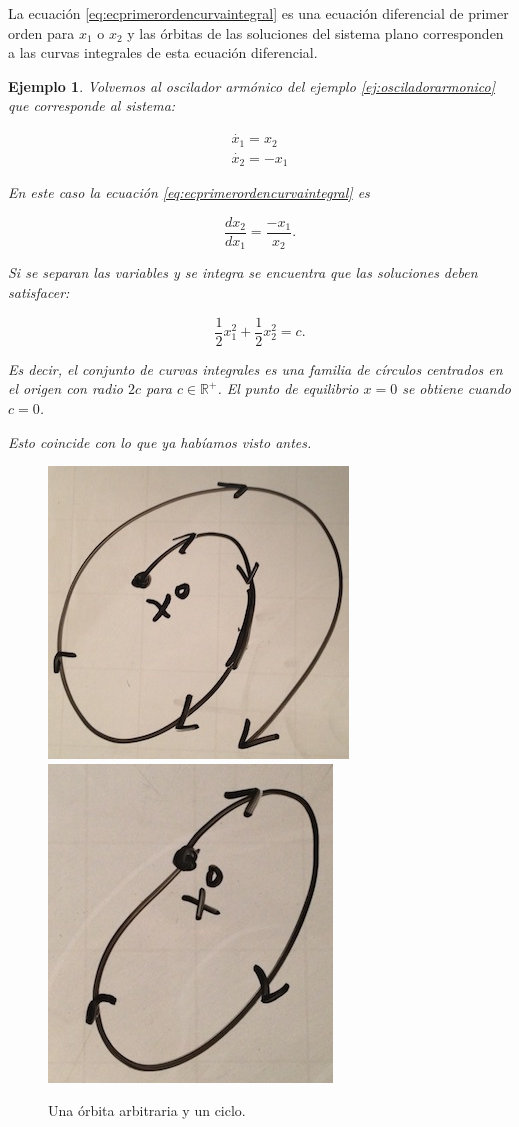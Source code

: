 \documentclass[11pt]{book}
\theoremstyle{definition}
\numberwithin{definition}{section}
\theoremstyle{theorem}
\numberwithin{theorem}{section}
\numberwithin{lemma}{section}
\numberwithin{corollary}{section}
\theoremstyle{plain}
\newtheorem{example}{Ejemplo}
\numberwithin{example}{section}
\newcommand{\R}{{\ensuremath{\mathbb{R}}}}
\begin{document}
La ecuación \ref{eq:ecprimerordencurvaintegral} es una ecuación diferencial de primer orden para $x_1$ o $x_2$ y las órbitas de las soluciones del sistema plano corresponden a las curvas integrales de esta ecuación diferencial.

\begin{example}
Volvemos al oscilador armónico del ejemplo \ref{ej:osciladorarmonico} que corresponde al sistema:

$$
\begin{array}{l}
	\dot{x_1} = x_2 \\
	\dot{x_2} = -x_1
\end{array}
$$

En este caso la ecuación \ref{eq:ecprimerordencurvaintegral} es

$$ \dfrac{dx_2}{dx_1} = \frac{-x_1}{x_2}.$$

Si se separan las variables y se integra se encuentra que las soluciones deben satisfacer:

$$ \frac{1}{2}x_1^2 + \frac{1}{2}x_2^2 = c.$$

Es decir, el conjunto de curvas integrales es una familia de círculos centrados en el origen con radio $2c$ para $c \in \R^+$. El punto de equilibrio $x = 0$ se obtiene cuando $c = 0$.

Esto coincide con lo que ya habíamos visto antes.
\end{example}


\begin{figure}[!ht] \centering
	\includegraphics[scale=0.5]{figures/orbita-arco.jpg}
	\includegraphics[scale=0.5]{figures/orbita-periodica.jpg}
	\caption{Una órbita arbitraria y un ciclo.}
\end{figure}
\end{document}
